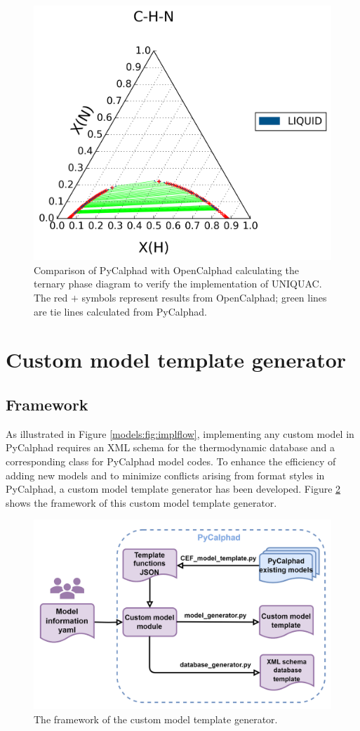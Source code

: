 \begin{figure}[H]
    \centering
    \includegraphics[width=0.5\linewidth]{models/Models-UQC-TernaryPD.png}
    \caption{Comparison of PyCalphad with OpenCalphad calculating the ternary phase diagram to verify the implementation of UNIQUAC. The red $+$ symbols represent results from OpenCalphad; green lines are tie lines calculated from PyCalphad.}
    \label{models:fig:UQCTernary}
\end{figure}

\section{Custom model template generator} \label{models:sec:CMTG}
\subsection{Framework} \label{models:ssec:CMTGframework}
As illustrated in Figure \ref{models:fig:implflow}, implementing any custom model in PyCalphad requires an XML schema for the thermodynamic database and a corresponding class for PyCalphad model codes. To enhance the efficiency of adding new models and to minimize conflicts arising from format styles in PyCalphad, a custom model template generator has been developed. Figure \ref{models:fig:CMGFrame} shows the framework of this custom model template generator.

\begin{figure}[H]
    \centering
    \includegraphics[width=0.8\linewidth]{models/Models-CMG-Framework.png}
    \caption{The framework of the custom model template generator.}
    \label{models:fig:CMGFrame}
\end{figure}


